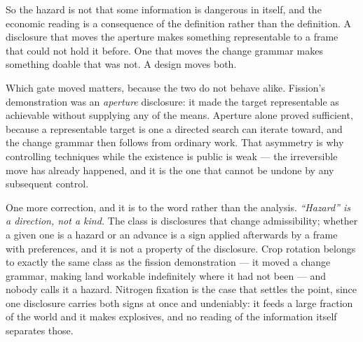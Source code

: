 \documentclass[11pt,a4paper]{article}
\theoremstyle{remark}\newtheorem{remark}[definition]{Remark}
\begin{document}
So the hazard is not that some information is dangerous in itself, and the economic reading is a
consequence of the definition rather than the definition. A disclosure that moves the aperture makes something representable
to a frame that could not hold it before. One that moves the change grammar makes something doable that
was not. A design moves both.

Which gate moved matters, because the two do not behave alike.
Fission's demonstration was an \emph{aperture} disclosure: it made the target representable as
achievable without supplying any of the means. Aperture alone proved sufficient, because a representable
target is one a directed search can iterate toward, and the change grammar then follows from ordinary
work. That asymmetry is why controlling techniques while the existence is public is weak --- the
irreversible move has already happened, and it is the one that cannot be undone by any subsequent
control.

One more correction, and it is to the word rather than the analysis. \emph{``Hazard'' is a direction,
not a kind.} The class is disclosures that change admissibility; whether a given one is a hazard or an
advance is a sign applied afterwards by a frame with preferences, and it is not a property of the
disclosure. Crop rotation belongs to exactly the same class as the fission demonstration --- it moved a
change grammar, making land workable indefinitely where it had not been --- and nobody calls it a
hazard. Nitrogen fixation is the case that settles the point, since one disclosure carries both signs at
once and undeniably: it feeds a large fraction of the world and it makes explosives, and no reading of
the information itself separates those.
\end{document}
